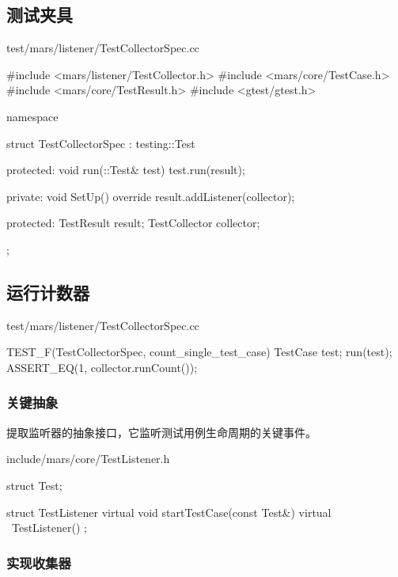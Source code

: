 \begin{content}

\subsection{测试夹具}

\begin{nodiff}{test/mars/listener/TestCollectorSpec.cc}
 \begin{c++}
#include <mars/listener/TestCollector.h>
#include <mars/core/TestCase.h>
#include <mars/core/TestResult.h>
#include <gtest/gtest.h>

namespace {
  struct TestCollectorSpec : testing::Test {
  protected:
    void run(::Test& test) {
      test.run(result);
    }

  private:
    void SetUp() override {
      result.addListener(collector);
    }

  protected:
    TestResult result;
    TestCollector collector;
  };
}
 \end{c++}
\end{nodiff} 

\subsection{运行计数器}

\begin{nodiff}{test/mars/listener/TestCollectorSpec.cc}
 \begin{c++}
TEST_F(TestCollectorSpec, count_single_test_case) {
  TestCase test;
  run(test);
  ASSERT_EQ(1, collector.runCount());
}
 \end{c++}
\end{nodiff} 

\subsubsection{关键抽象}

提取监听器的抽象接口，它监听测试用例生命周期的关键事件。

\begin{nodiff}{include/mars/core/TestListener.h}
 \begin{c++}
struct Test;

struct TestListener {
  virtual void startTestCase(const Test&) {}
  virtual ~TestListener() {}
};
  \end{c++}
\end{nodiff}

\subsubsection{实现收集器}


\end{content}
